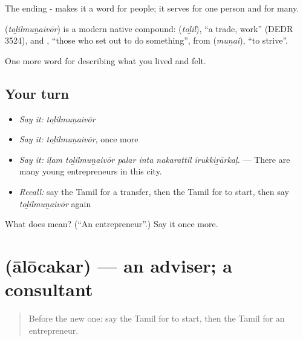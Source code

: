 The ending - makes it a word for people; it serves for one person and for many.

\begin{cousinweb}
\textbf{} (\emph{toḻilmuṉaivōr}) is a modern native compound:  (\emph{toḻil}), \textquotedblleft{}a trade, work\textquotedblright{} (DEDR 3524), and , \textquotedblleft{}those who set out to do something\textquotedblright{}, from  (\emph{muṉai}), \textquotedblleft{}to strive\textquotedblright{}.
\end{cousinweb}

\begin{grammarlens}[title={What you've built}]
One more word for describing what you lived and felt.
\end{grammarlens}

\subsection*{Your turn}
\begin{itemize}
\raggedright
  \item \emph{Say it:} \emph{toḻilmuṉaivōr}
  \item \emph{Say it:} \emph{toḻilmuṉaivōr}, once more
  \item \emph{Say it:} \emph{iḷam toḻilmuṉaivōr palar inta nakarattil irukkiṟārkaḷ.} — There are many young entrepreneurs in this city.
  \item \emph{Recall:} say the Tamil for a transfer, then the Tamil for to start, then say \emph{toḻilmuṉaivōr} again
\end{itemize}

\begin{tcolorbox}[breakable,colback=teal!4,colframe=teal!35!black,title={Before you move on}]
What does  mean? (\textquotedblleft{}An entrepreneur\textquotedblright{}.) Say it once more.
\end{tcolorbox}
\section[\texorpdfstring{\ta{ஆலோசகர்} (ālōcakar)}{ஆலோசகர் (ālōcakar)}]{ (ālōcakar) — an adviser; a consultant}

\label{lesson:TA-C513-alocakar}



\begin{quote}
Before the new one: say the Tamil for to start, then the Tamil for an entrepreneur.
\end{quote}

